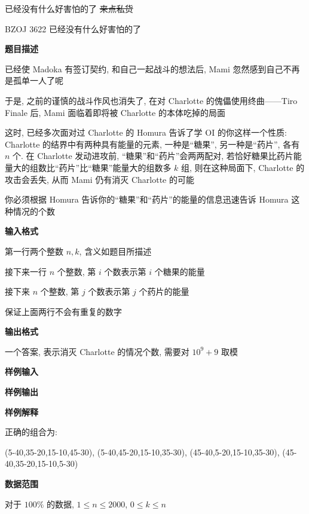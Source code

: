 \begin{frame}[fragile]{已经没有什么好害怕的了}
	\sout{来点私货}

\end{frame}


\begin{frame}{BZOJ 3622 已经没有什么好害怕的了}
	\label{incexc:example:bzoj3622}

	\textbf{题目描述}

	已经使 Madoka 有签订契约, 和自己一起战斗的想法后, Mami 忽然感到自己不再是孤单一人了呢

	于是, 之前的谨慎的战斗作风也消失了, 在对 Charlotte 的傀儡使用终曲——Tiro Finale 后, Mami 面临着即将被 Charlotte 的本体吃掉的局面

	这时, 已经多次面对过 Charlotte 的 Homura 告诉了学 OI 的你这样一个性质: Charlotte 的结界中有两种具有能量的元素, 一种是``糖果'', 另一种是``药片'', 各有 \(n\) 个. 在 Charlotte 发动进攻前, ``糖果''和``药片''会两两配对, 若恰好糖果比药片能量大的组数比``药片''比``糖果''能量大的组数多 \(k\) 组, 则在这种局面下, Charlotte 的攻击会丢失, 从而 Mami 仍有消灭 Charlotte 的可能

	你必须根据 Homura 告诉你的``糖果''和``药片''的能量的信息迅速告诉 Homura 这种情况的个数

	\textbf{输入格式}

	第一行两个整数 \(n,k\), 含义如题目所描述

	接下来一行 \(n\) 个整数, 第 \(i\) 个数表示第 \(i\) 个糖果的能量

	接下来 \(n\) 个整数, 第 \(j\) 个数表示第 \(j\) 个药片的能量

	保证上面两行不会有重复的数字

	\textbf{输出格式}

	一个答案, 表示消灭 Charlotte 的情况个数, 需要对 \(10^9+9\) 取模

	\textbf{样例输入}


	\textbf{样例输出}


	\textbf{样例解释}

	正确的组合为:

	(5-40,35-20,15-10,45-30), (5-40,45-20,15-10,35-30), (45-40,5-20,15-10,35-30), (45-40,35-20,15-10,5-30)

	\textbf{数据范围}

	对于 \(100\%\) 的数据, \(1 \le n \le 2000\), \(0 \le k \le n\)
\end{frame}


